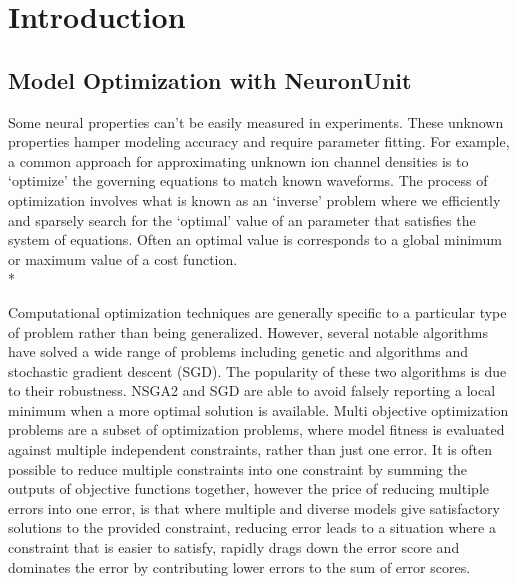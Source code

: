 
%
\section{Introduction}

\subsection{Model  Optimization with NeuronUnit}
Some neural properties can’t be easily measured in experiments. These unknown properties hamper modeling accuracy and require parameter fitting. For example, a common approach for approximating unknown ion channel densities is to ‘optimize’ the governing equations to match known waveforms. The process of optimization involves what is known as an ‘inverse’ problem where we efficiently and sparsely search for the ‘optimal’ value of an parameter that satisfies the system of equations. Often an optimal value is corresponds to a global minimum or maximum value of a cost function.\\*

Computational optimization techniques are generally specific to a particular type of problem rather than being generalized. However, several notable algorithms have solved a wide range of problems including genetic and algorithms and stochastic gradient descent (SGD). The popularity of these two algorithms is due to their robustness. NSGA2 and SGD are able to avoid falsely reporting a local minimum when a more optimal solution is available. 
 Multi objective optimization problems are a subset of optimization problems, where model fitness is evaluated against multiple independent constraints, rather than just one error. It is often possible to reduce multiple constraints into one constraint by summing the outputs of objective functions together, however the price of reducing multiple errors into one error, is that where multiple and diverse models give satisfactory solutions to the provided constraint, reducing error leads to a situation where a constraint that is easier to satisfy, rapidly drags down the error score and dominates the error by contributing lower errors to the sum of error scores.

